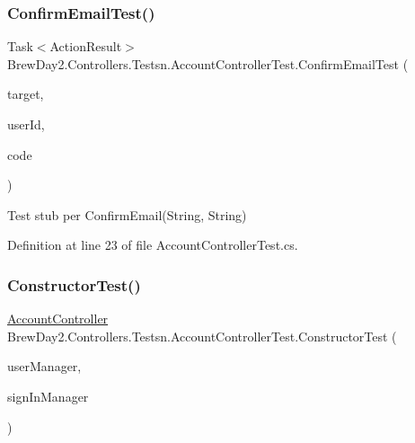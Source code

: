 \subsubsection{\texorpdfstring{Confirm\+Email\+Test()}{ConfirmEmailTest()}}
{\footnotesize\ttfamily Task$<$Action\+Result$>$ Brew\+Day2.\+Controllers.\+Testsn.\+Account\+Controller\+Test.\+Confirm\+Email\+Test (\begin{DoxyParamCaption}\item[{\mbox{[}\+Pex\+Assume\+Under\+Test\mbox{]} \mbox{\hyperlink{class_brew_day2_1_1_controllers_1_1_account_controller}{Account\+Controller}}}]{target,  }\item[{string}]{user\+Id,  }\item[{string}]{code }\end{DoxyParamCaption})}



Test stub per Confirm\+Email(\+String, String)



Definition at line 23 of file Account\+Controller\+Test.\+cs.

\mbox{\label{class_brew_day2_1_1_controllers_1_1_testsn_1_1_account_controller_test_a79f90c8a8998b1d67a96925d660ec5d4}} 
\subsubsection{\texorpdfstring{Constructor\+Test()}{ConstructorTest()}}
{\footnotesize\ttfamily \mbox{\hyperlink{class_brew_day2_1_1_controllers_1_1_account_controller}{Account\+Controller}} Brew\+Day2.\+Controllers.\+Testsn.\+Account\+Controller\+Test.\+Constructor\+Test (\begin{DoxyParamCaption}\item[{\mbox{\hyperlink{class_brew_day2_1_1_application_user_manager}{Application\+User\+Manager}}}]{user\+Manager,  }\item[{\mbox{\hyperlink{class_brew_day2_1_1_application_sign_in_manager}{Application\+Sign\+In\+Manager}}}]{sign\+In\+Manager }\end{DoxyParamCaption})}



